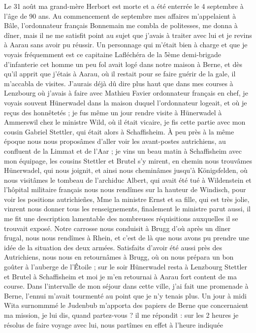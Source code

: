 \documentclass[12pt]{article}
\begin{document}
 Le 31 août ma grand-mère Herbort est morte et
a été enterrée le 4 septembre à l’âge de 90 ans. Au commencement de septembre mes affaires
m’appelaient à Bâle, l’ordonnateur français Bonnemain me combla de politesses, me donna à dîner,
mais il ne me satisfit point au sujet que j’avais à traiter avec lui et je revins à Aarau sans avoir
pu réussir. Un personnage qui m’était bien à charge et que je voyais fréquemment est ce capitaine
Lafléchéra de la 5ème demi-brigade d’infanterie cet homme un peu fol avait logé dans notre maison à
Berne, et dès qu’il apprit que j’étais à Aarau, où il restait pour se faire guérir de la gale, il
m’accabla de visites. J’aurais déjà dû dire plus haut que dans mes courses à Lenzbourg où j’avais à
faire avec Mathieu Favier ordonnateur français en chef, je voyais souvent Hünerwadel dans la maison
duquel l’ordonnateur logeait, et où je reçus des honnêtetés ; je fus même un jour rendre visite à
Hünerwadel à Ammerswil chez le ministre Wild, où il était vicaire, je fis cette partie avec mon
cousin Gabriel Stettler, qui était alors à Schaffisheim. À peu près à la même époque nous nous
proposâmes d’aller voir les avant-postes autrichiens, au confluent de la Limmat et de l’Aar ; je
vins un beau matin à Schaffisheim avec mon équipage, les cousins Stettler et Brutel s’y mirent, en
chemin nous trouvâmes Hünerwadel, qui nous joignit, et ainsi nous cheminâmes jusqu’à Königsfelden,
où nous visitâmes le tombeau de l’archiduc Albert, qui avait été tué à Wildenstein et l’hôpital
militaire français nous nous rendîmes sur la hauteur de Windisch, pour voir les positions
autrichieñes, Mme la ministre Ernst et sa fille, qui est très jolie, vinrent nous donner tous les
renseignements, finalement le ministre parut aussi, il me fit une description lamentable des
nombreuses réquisitions auxquelles il se trouvait exposé. Notre carrosse nous conduisit à Brugg d’où
après un dîner frugal, nous nous rendîmes à Rhein, et c’est de là que nous avons pu prendre une idée
de la situation des deux armées. Satisfaits d’avoir été aussi près des Autrichiens, nous nous en
retournâmes à Brugg, où on nous prépara un bon goûter à l’auberge de l’É́toile ; sur le soir
Hünerwadel resta à Lenzbourg Stettler et Brutel à Schaffisheim et moi je m’en retournai à Aarau fort
content de ma course. Dans l’intervalle de mon séjour dans cette ville, j’ai fait une promenade à
Berne, l’ennui m’avait tourmenté au point que je n’y tenais plus. Un jour à midi Wita surnommmé le
Judenbub m’apporta des papiers de Berne que concernaient ma mission, je lui dis, quand partez-vous ?
il me répondit : sur les 2 heures je résolus de faire voyage avec lui, nous partîmes en effet à
l’heure indiquée
\end{document}
